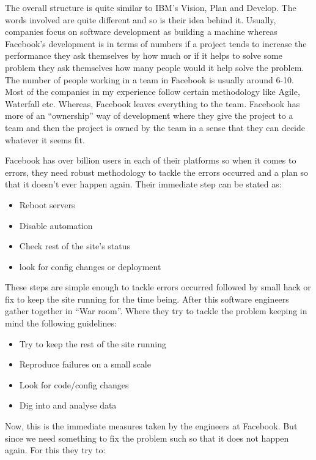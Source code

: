 The overall structure is quite similar to IBM's Vision, Plan and Develop. The words involved are quite different and so is their idea behind it. Usually, companies focus on software development as building a machine whereas Facebook's development is in terms of numbers if a project tends to increase the performance they ask themselves by how much or if it helps to solve some problem they ask themselves how many people would it help solve the problem. The number of people working in a team in Facebook is usually around 6-10. Most of the companies in my experience follow certain methodology like Agile, Waterfall etc. Whereas, Facebook leaves everything to the team. Facebook has more of an ``ownership'' way of development where they give the project to a team and then the project is owned by the team in a sense that they can decide whatever it seems fit.

Facebook has over billion users in each of their platforms so when it comes to errors, they need robust methodology to tackle the errors occurred and a plan so that it doesn't ever happen again. Their immediate step can be stated as:

\begin{itemize}
      \item Reboot servers
      \item Disable automation
      \item Check rest of the site's status
      \item look for config changes or deployment
\end{itemize}

These steps are simple enough to tackle errors occurred followed by small hack or fix to keep the site running for the time being. After this software engineers gather together in ``War room''. Where they try to tackle the problem keeping in mind the following guidelines:

\begin{itemize}
      \item Try to keep the rest of the site running
      \item Reproduce failures on a small scale
      \item Look for code/config changes
      \item Dig into and analyse data
\end{itemize}

Now, this is the immediate measures taken by the engineers at Facebook. But since we need something to fix the problem such so that it does not happen again. For this they try to:

